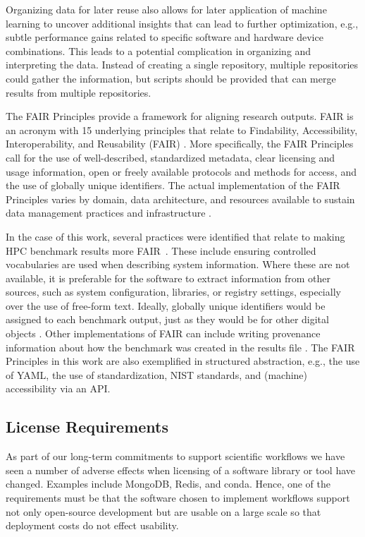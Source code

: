 \documentclass[sigconf]{acmart}
\begin{document}
Organizing data for later reuse also allows for later application of machine learning to uncover additional insights that can lead to further optimization, e.g., subtle performance gains related to specific software and hardware device combinations. This leads to a potential complication in organizing and interpreting the data. Instead of creating a single repository, multiple repositories could gather the information, but scripts should be provided that can merge results from multiple repositories.

The FAIR Principles provide a framework for aligning research outputs. FAIR is an acronym with 15 underlying principles that relate to Findability, Accessibility, Interoperability, and Reusability (FAIR) \citep{wilkinson2016fair}. More specifically, the FAIR Principles call for the use of well-described, standardized metadata, clear licensing and usage information, open or freely available protocols and methods for access, and the use of globally unique identifiers. The actual implementation of the FAIR Principles varies by domain, data architecture, and resources available to sustain data management practices and infrastructure \citep{jacobsen2020fair}.

In the case of this work, several practices were identified that relate to making HPC benchmark results more FAIR~\citep{kirkpatrick2025}. These include ensuring controlled vocabularies are used when describing system information. Where these are not available, it is preferable for the software to extract information from other sources, such as system configuration, libraries, or registry settings, especially over the use of free-form text. Ideally, globally unique identifiers would be assigned to each benchmark output, just as they would be for other digital objects \citep{garcia2025}. Other implementations of FAIR can include writing provenance information about how the benchmark was created in the results file \citep{souza2023}. The FAIR Principles in this work are also exemplified in structured abstraction, e.g., the use of YAML, the use of standardization, NIST standards, and (machine) accessibility via an API.

\subsection{License Requirements} 
\label{sec:license}

As part of our long-term commitments to support scientific workflows we have seen a number of adverse effects when licensing of a software library or tool have changed.
Examples include MongoDB, Redis, and conda. Hence, one of the requirements must be that the software chosen to implement workflows support not only open-source development but are usable on a large scale so that deployment costs do not effect usability. 
\end{document}
